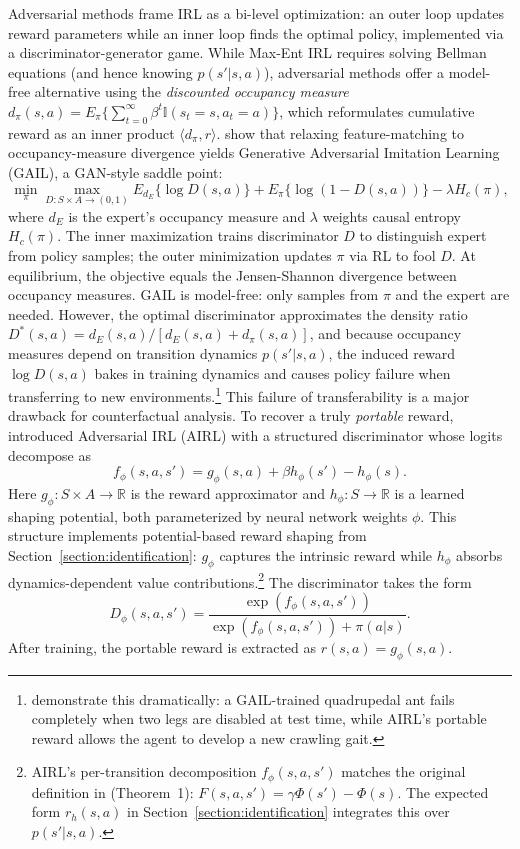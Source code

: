Adversarial methods frame IRL as a bi-level optimization: an outer loop updates reward parameters while an inner loop finds the optimal policy, implemented via a discriminator-generator game. While Max-Ent IRL requires solving Bellman equations (and hence knowing $p(s'|s,a)$), adversarial methods offer a model-free alternative using the \emph{discounted occupancy measure} $d_\pi(s,a) = E_\pi\{\sum_{t=0}^\infty \beta^t \mathbb{I}(s_t=s, a_t=a)\}$, which reformulates cumulative reward as an inner product $\langle d_\pi, r \rangle$. \citet{ho:2016} show that relaxing feature-matching to occupancy-measure divergence yields Generative Adversarial Imitation Learning (GAIL), a GAN-style saddle point:
\begin{equation}
    \min_\pi \max_{D: S \times A \to (0,1)} E_{d_E}\{\log D(s,a)\} + E_\pi\{\log(1-D(s,a))\} - \lambda H_c(\pi),
\label{eq:gail_saddle}
\end{equation}
where $d_E$ is the expert's occupancy measure and $\lambda$ weights causal entropy $H_c(\pi)$. The inner maximization trains discriminator $D$ to distinguish expert from policy samples; the outer minimization updates $\pi$ via RL to fool $D$. At equilibrium, the objective equals the Jensen-Shannon divergence between occupancy measures. GAIL is model-free: only samples from $\pi$ and the expert are needed. However, the optimal discriminator approximates the density ratio $D^*(s,a) = d_E(s,a)/[d_E(s,a) + d_\pi(s,a)]$, and because occupancy measures depend on transition dynamics $p(s'|s,a)$, the induced reward $\log D(s,a)$ bakes in training dynamics and causes policy failure when transferring to new environments.\footnote{\footnotesize \citet{fu:2018} demonstrate this dramatically: a GAIL-trained quadrupedal ant fails completely when two legs are disabled at test time, while AIRL's portable reward allows the agent to develop a new crawling gait.} This failure of transferability is a major drawback for counterfactual analysis. To recover a truly \emph{portable} reward, \citet{fu:2018} introduced Adversarial IRL (AIRL) with a structured discriminator whose logits decompose as
\begin{equation}
    f_\phi(s,a,s') = g_\phi(s,a) + \beta h_\phi(s') - h_\phi(s).
\label{eq:airl_decomp}
\end{equation}
Here $g_\phi: S \times A \to \mathbb{R}$ is the reward approximator and $h_\phi: S \to \mathbb{R}$ is a learned shaping potential, both parameterized by neural network weights $\phi$. This structure implements potential-based reward shaping from Section~\ref{section:identification}: $g_\phi$ captures the intrinsic reward while $h_\phi$ absorbs dynamics-dependent value contributions.\footnote{\footnotesize AIRL's per-transition decomposition $f_\phi(s,a,s')$ matches the original definition in \citet{nhr:1999} (Theorem~1): $F(s,a,s')=\gamma\Phi(s')-\Phi(s)$. The expected form $r_h(s,a)$ in Section~\ref{section:identification} integrates this over $p(s'|s,a)$.} The discriminator takes the form
\begin{equation}
    D_\phi(s,a,s') = \frac{\exp(f_\phi(s,a,s'))}{\exp(f_\phi(s,a,s')) + \pi(a|s)}.
\label{eq:airl_discriminator}
\end{equation}
After training, the portable reward is extracted as $r(s,a) = g_\phi(s,a)$.

